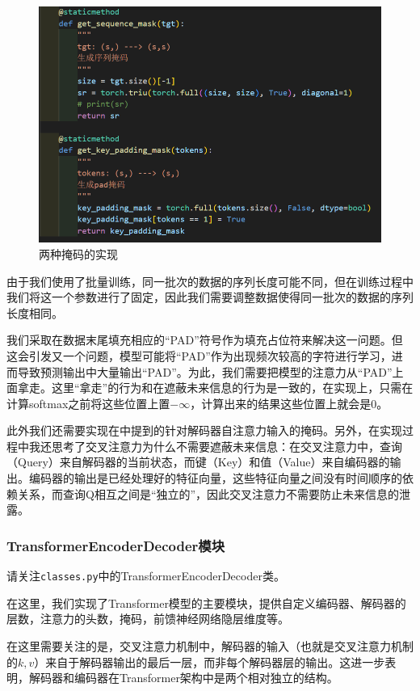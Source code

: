\begin{figure}[h]
    \centering
    \includegraphics[width=0.8\linewidth]{img/simpleT/simpleT-mask.png}
    \caption{两种掩码的实现}
    \label{fig:simpletT-mask}
\end{figure}

由于我们使用了批量训练，同一批次的数据的序列长度可能不同，但在训练过程中我们将这一个参数进行了固定，因此我们需要调整数据使得同一批次的数据的序列长度相同。

我们采取在数据末尾填充相应的“PAD”符号作为填充占位符来解决这一问题。但这会引发又一个问题，模型可能将“PAD”作为出现频次较高的字符进行学习，进而导致预测输出中大量输出“PAD”。为此，我们需要把模型的注意力从“PAD”上面拿走。这里“拿走”的行为和在遮蔽未来信息的行为是一致的，在实现上，只需在计算softmax之前将这些位置上置$-\infty$，计算出来的结果这些位置上就会是$0$。

此外我们还需要实现在\label{sec-2:mask}中提到的针对解码器自注意力输入的掩码。另外，在实现过程中我还思考了交叉注意力为什么不需要遮蔽未来信息：在交叉注意力中，查询（Query）来自解码器的当前状态，而键（Key）和值（Value）来自编码器的输出。编码器的输出是已经处理好的特征向量，这些特征向量之间没有时间顺序的依赖关系，而查询Q相互之间是“独立的”，因此交叉注意力不需要防止未来信息的泄露。

\subsubsection{TransformerEncoderDecoder模块}

请关注\texttt{classes.py}中的TransformerEncoderDecoder类。

在这里，我们实现了Transformer模型的主要模块，提供自定义编码器、解码器的层数，注意力的头数，掩码，前馈神经网络隐层维度等。

在这里需要关注的是，交叉注意力机制中，解码器的输入（也就是交叉注意力机制的$k,v$）来自于解码器输出的最后一层，而非每个解码器层的输出。这进一步表明，解码器和编码器在Transformer架构中是两个相对独立的结构。

